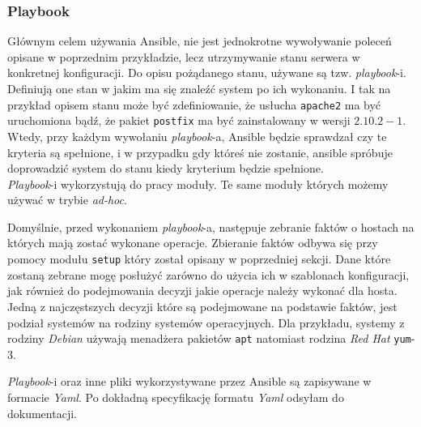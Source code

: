 \subsubsection{Playbook}
Głównym celem używania Ansible, nie jest jednokrotne wywoływanie poleceń opisane w poprzednim przykładzie, lecz utrzymywanie stanu serwera w konkretnej konfiguracji.
Do opisu pożądanego stanu, używane są tzw. \textit{playbook}-i.
Definiują one stan w jakim ma się znaleźć system po ich wykonaniu.
I tak na przykład opisem stanu może być zdefiniowanie, że usłucha \texttt{apache2} ma być uruchomiona bądź, że pakiet \texttt{postfix} ma być zainstalowany w wersji $2.10.2-1$.
Wtedy, przy każdym wywołaniu \textit{playbook}-a, Ansible będzie sprawdzał czy te kryteria są spełnione, i w przypadku gdy któreś nie zostanie, ansible spróbuje doprowadzić system do stanu kiedy kryterium będzie spełnione.\\
\textit{Playbook}-i wykorzystują do pracy moduły. Te same moduły których możemy używać w trybie \textit{ad-hoc}.

Domyślnie, przed wykonaniem \textit{playbook}-a, następuje zebranie faktów o hostach na których mają zostać wykonane operacje.
Zbieranie faktów odbywa się przy pomocy modułu \texttt{setup} który został opisany w poprzedniej sekcji.
Dane które zostaną zebrane mogę posłużyć zarówno do użycia ich w szablonach konfiguracji, jak również do podejmowania decyzji jakie operacje należy wykonać dla hosta. Jedną z najczęstszych decyzji które są podejmowane na podstawie faktów, jest podział systemów na rodziny systemów operacyjnych.
Dla przykładu, systemy z rodziny \textit{Debian} używają menadżera pakietów \texttt{apt} natomiast rodzina \textit{Red Hat} \texttt{yum}-3.

\textit{Playbook}-i oraz inne pliki wykorzystywane przez Ansible są zapisywane w formacie \textit{Yaml}.
Po dokładną specyfikację formatu \textit{Yaml} odsyłam do dokumentacji.\\

